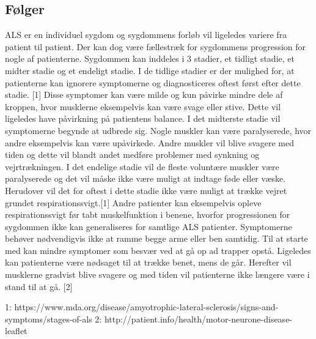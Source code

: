 \subsection{Følger}

ALS er en individuel sygdom og sygdommens forløb vil ligeledes variere fra patient til patient. Der kan dog være fællestræk for sygdommens progression for nogle af patienterne. Sygdommen kan inddeles i 3 stadier, et tidligt stadie, et midter stadie og et endeligt stadie. I de tidlige stadier er der mulighed for, at patienterne kan ignorere symptomerne og diagnosticeres oftest først efter dette stadie. [1] Disse symptomer kan være milde og kun påvirke mindre dele af kroppen, hvor musklerne eksempelvis kan være svage eller stive. Dette vil ligeledes have påvirkning på patientens balance. I det midterste stadie vil symptomerne begynde at udbrede sig. Nogle muskler kan være paralyserede, hvor andre eksempelvis kan være upåvirkede. Andre muskler vil blive svagere med tiden og dette vil blandt andet medføre problemer med synkning og vejrtrækningen. I det endelige stadie vil de fleste voluntære muskler være paralyserede og det vil måske ikke være muligt at indtage føde eller væske. Herudover vil det for oftest i dette stadie ikke være muligt at trække vejret grundet respirationssvigt.[1] Andre patienter kan eksempelvis opleve respirationssvigt før tabt muskelfunktion i benene, hvorfor progressionen for sygdommen ikke kan generaliseres for samtlige ALS patienter. Symptomerne behøver nødvendigvis ikke at ramme begge arme eller ben samtidig. Til at starte med kan mindre symptomer som besvær ved at gå op ad trapper opstå. Ligeledes kan patienterne være nødsaget til at trække benet, mens de går. Herefter vil musklerne gradvist blive svagere og med tiden vil patienterne ikke længere være i stand til at gå. [2] 


1: https://www.mda.org/disease/amyotrophic-lateral-sclerosis/signs-and-symptoms/stages-of-als 
2: http://patient.info/health/motor-neurone-disease-leaflet 
